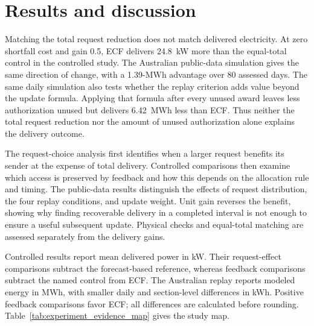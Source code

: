 \documentclass[twoside,twocolumn,9pt]{article}
\begin{document}
\section{Results and discussion}
\label{sec:results}

Matching the total request reduction does not match delivered electricity.
At zero shortfall cost and gain 0.5, ECF delivers 24.8~kW more than the
equal-total control in the controlled study. The Australian public-data
simulation gives the same direction of change, with a 1.39-MWh advantage over
80 assessed days. The same daily simulation also tests whether the replay
criterion adds value beyond the update formula. Applying that formula after
every unused award leaves less authorization unused but delivers 6.42~MWh
less than ECF. Thus neither the total request reduction nor the amount of
unused authorization alone explains the delivery outcome.

The request-choice analysis first identifies when a larger request benefits
its sender at the expense of total delivery. Controlled comparisons then
examine which access is preserved by feedback and how this depends on the
allocation rule and timing. The public-data results distinguish the effects
of request distribution, the four replay conditions, and update weight. Unit gain
reverses the benefit, showing why finding recoverable delivery in a completed
interval is not enough to ensure a useful subsequent update. Physical checks
and equal-total matching are assessed separately from the delivery gains.

Controlled results report mean delivered power in kW. Their request-effect
comparisons subtract the forecast-based reference, whereas feedback comparisons
subtract the named control from ECF. The Australian replay reports modeled
energy in MWh, with smaller daily and section-level differences in kWh.
Positive feedback comparisons favor ECF; all differences are calculated before
rounding. Table~\ref{tab:experiment_evidence_map} gives the study map.
\end{document}
